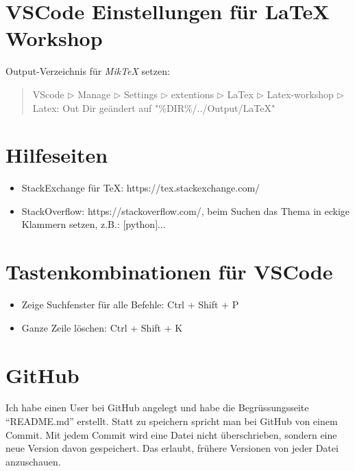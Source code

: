 \documentclass[a4paper]{article} %
\begin{document}
    \section{VSCode Einstellungen für LaTeX Workshop} %
   
    Output-Verzeichnis für \textsl{MikTeX} setzen:
    \begin{quote}
        VScode $\triangleright$ Manage $\triangleright$ Settings $\triangleright$ extentions $\triangleright$ LaTex $\triangleright$ Latex-workshop $\triangleright$ Latex: Out Dir
        geändert auf "\%DIR\%/../Output/LaTeX"
    \end{quote}

    \section{Hilfeseiten} %
  
    \begin{itemize}
        \item StackExchange für TeX: https://tex.stackexchange.com/
        \item StackOverflow: https://stackoverflow.com/,
        beim Suchen das Thema in eckige Klammern setzen,
        z.B.: [python]...
    \end{itemize}

    \section{Tastenkombinationen für VSCode} %
  
    \begin{itemize}
       \item Zeige Suchfenster für alle Befehle: Ctrl + Shift + P
       \item Ganze Zeile löschen: Ctrl + Shift + K
    \end{itemize}
      
    \section{GitHub} %
  
    Ich habe einen User bei GitHub angelegt 
    und habe die Begrüssungsseite ``README.md'' erstellt.
    Statt zu speichern spricht man bei GitHub von einem Commit.
    Mit jedem Commit wird eine Datei nicht überschrieben,
    sondern eine neue Version davon gespeichert.
    Das erlaubt, frühere Versionen von jeder Datei anzuschauen.
    
\end{document}
